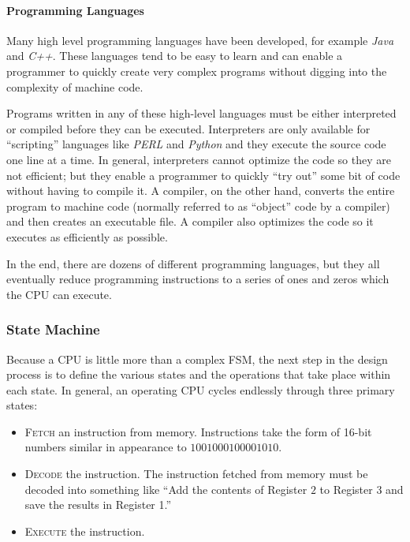 \paragraph{Programming Languages}

Many high level programming languages have been developed, for example \emph{Java} and \emph{C++}. These languages tend to be easy to learn and can enable a programmer to quickly create very complex programs without digging into the complexity of machine code.

Programs written in any of these high-level languages must be either interpreted or compiled before they can be executed. Interpreters are only available for ``scripting'' languages like \emph{PERL} and \emph{Python} and they execute the source code one line at a time. In general, interpreters cannot optimize the code so they are not efficient; but they enable a programmer to quickly ``try out'' some bit of code without having to compile it. A compiler, on the other hand, converts the entire program to machine code (normally referred to as ``object'' code by a compiler) and then creates an executable file. A compiler also optimizes the code so it executes as efficiently as possible.

In the end, there are dozens of different programming languages, but they all eventually reduce programming instructions to a series of ones and zeros which the \ac{CPU} can execute.

\subsubsection{State Machine}

Because a \ac{CPU} is little more than a complex \ac{FSM}, the next step in the design process is to define the various states and the operations that take place within each state. In general, an operating \ac{CPU} cycles endlessly through three primary states:

\begin{itemize}
  \item \textsc{Fetch} an instruction from memory. Instructions take the form of 16-bit numbers similar in appearance to $ 1001 0001 0000 1010 $.
  \item \textsc{Decode} the instruction. The instruction fetched from memory must be decoded into something like ``Add the contents of Register $ 2 $ to Register $ 3 $ and save the results in Register 1.''
  \item \textsc{Execute} the instruction.
\end{itemize}

